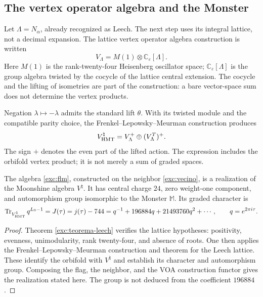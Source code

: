 \subsection{The vertex operator algebra and the Monster}
\label{exc:voa}

Let $\Lambda=N_\alpha$, already recognized as Leech. The next step
uses its integral lattice, not a decimal expansion. The
lattice vertex operator algebra construction is written
\[
 V_\Lambda=M(1)\otimes\mathbb C_\varepsilon[\Lambda].
\]
Here $M(1)$ is the rank-twenty-four Heisenberg oscillator
space; $\mathbb C_\varepsilon[\Lambda]$ is the group algebra
twisted by the cocycle of the lattice central extension. The
cocycle and the lifting of isometries are part of the
construction: a bare vector-space sum does not determine the vertex
products.

Negation $\lambda\mapsto-\lambda$ admits the standard lift
$\theta$. With its twisted module and the compatible parity choice,
the Frenkel--Lepowsky--Meurman construction produces
\begin{equation}
 V^\natural_{\rm HMT}
   =V_\Lambda^+\oplus(V_\Lambda^T)^+.
 \label{exc:flm}
\end{equation}
The sign $+$ denotes the even part of the lifted action. The expression
includes the orbifold vertex product; it is not merely a sum
of graded spaces.

\begin{theorem}
\label{exc:moonshine}
The algebra \eqref{exc:flm}, constructed on the neighbor
\eqref{exc:vecino}, is a realization of the Moonshine algebra
$V^\natural$. It has central charge $24$, zero weight-one component,
and automorphism group isomorphic to the Monster $\mathbb M$. Its graded
character is
\begin{equation}
 \operatorname{Tr}_{V^\natural_{\rm HMT}}q^{L_0-1}
   =J(\tau)=j(\tau)-744
   =q^{-1}+196884q+21493760q^2+\cdots,
 \qquad q=e^{2\pi i\tau}.
 \label{exc:j}
\end{equation}
\end{theorem}

\begin{proof}
Theorem \ref{exc:teorema-leech} verifies the lattice hypotheses:
positivity, evenness, unimodularity, rank twenty-four, and absence of
roots. One then applies the Frenkel--Lepowsky--Meurman
construction and theorem for the Leech lattice. These identify
the orbifold with $V^\natural$ and establish its character and automorphism
group. Composing the flag, the neighbor, and the VOA
construction functor gives the realization stated here. The group is not
deduced from the coefficient $196884$.
\end{proof}

